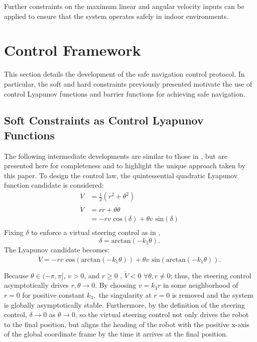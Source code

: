 \documentclass[journal]{IEEEtran}
\begin{document}
Further constraints on the maximum linear and angular velocity inputs can be applied to ensure that the system operates safely in indoor environments. 

\section{Control Framework}
This section details the development of the safe navigation control protocol. In particular, the soft and hard constraints previously presented motivate the use of control Lyapunov functions and barrier functions for achieving safe navigation.

\subsection{Soft Constraints as Control Lyapunov Functions}
The following intermediate developments are similar to those in \cite{park2011}, but are presented here for completeness and to highlight the unique approach taken by this paper. To design the control law, the quintessential quadratic Lyapunov function candidate is considered:
\begin{align*}
V&=\frac{1}{2}(r^2+\theta^2)\\
\dot{V}&=r \dot{r}+\theta \dot{\theta}\\
&=-r v \text{ cos}(\delta) + \theta v \text{ sin}(\delta)\\ 
\end{align*}
Fixing $\delta$ to enforce a virtual steering control as in \cite{park2011}, $$\delta = \text{arctan}(-k_1\theta).$$ The Lyapunov candidate becomes:
\begin{equation}
\dot{V}=-r v \text{ cos}(\text{arctan}(-k_1\theta)) + \theta v \text{ sin}(\text{arctan}(-k_1\theta)).
\end{equation} 

Because $\theta\in (-\pi,\pi]$, $v>0$, and $r\geq 0$ , $\dot{V}<0$ $\forall \theta,r\neq0$; thus, the steering control asymptotically drives $r,\theta\to 0$. By choosing $v=k_3 r$ in some neighborhood of $r=0$ for positive constant $k_3,$ the singularity at $r=0$ is removed and the system is globally asymptotically stable. Furthermore, by the definition of the steering control, $\delta\to 0$ as $\theta \to 0$, so the virtual steering control not only drives the robot to the final position, but aligns the heading of the robot with the positive x-axis of the global coordinate frame by the time it arrives at the final position. 
\end{document}

